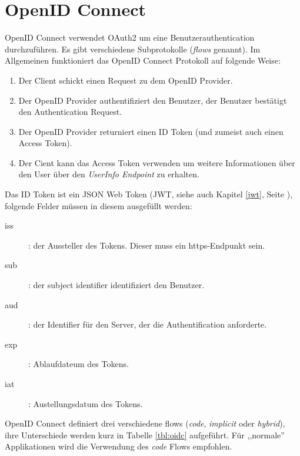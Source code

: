 \section{OpenID Connect}

OpenID Connect verwendet OAuth2 um eine Benutzerauthentication durchzuführen. Es gibt verschiedene Subprotokolle (\textit{flows} genannt). Im Allgemeinen funktioniert das OpenID Connect Protokoll auf folgende Weise:

\begin{enumerate}
	\item Der Client schickt einen Request zu dem OpenID Provider.
	\item Der OpenID Provider authentifiziert den Benutzer, der Benutzer bestätigt den Authentication Request.
	\item Der OpenID Provider returniert einen ID Token (und zumeist auch einen Access Token).
	\item Der Cient kann das Access Token verwenden um weitere Informationen über den User über den \textit{UserInfo Endpoint} zu erhalten.
\end{enumerate}

Das ID Token ist ein JSON Web Token (JWT, siehe auch Kapitel \ref{jwt}, Seite \pageref{jwt}), folgende Felder müssen in diesem ausgefüllt werden:

\begin{description}
	\item[iss]: der Aussteller des Tokens. Dieser muss ein https-Endpunkt sein.
	\item[sub]: der subject identifier identifiziert den Benutzer.
	\item[aud]: der Identifier für den Server, der die Authentification anforderte.
	\item[exp]: Ablaufdateum des Tokens.
	\item[iat]: Austellungsdatum des Tokens.
\end{description}

OpenID Connect definiert drei verschiedene flows (\textit{code}, \textit{implicit} oder \textit{hybrid}), ihre Unterschiede werden kurz in Tabelle \ref{tbl:oidc} aufgeführt. Für ,,normale'' Applikationen wird die Verwendung des \textit{code} Flows empfohlen.


